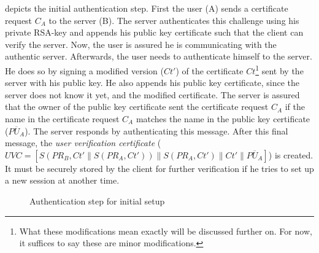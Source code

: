  depicts the initial authentication step. First the user (A) sends a certificate request $C_A$ to the server (B). The server authenticates this challenge using his private RSA-key and appends his public key certificate such that the client can verify the server. Now, the user is assured he is communicating with the authentic server. Afterwards, the user needs to authenticate himself to the server. He does so by signing a modified version ($Ct'$) of the certificate $Ct$\footnote{What these modifications mean exactly will be discussed further on. For now, it suffices to say these are minor modifications.} sent by the server with his public key. He also appends his public key certificate, since the server does not know it yet, and the modified certificate. The server is assured that the owner of the public key certificate sent the certificate request $C_A$ if the name in the certificate request $C_A$ matches the name in the public key certificate ($\overline{PU_A}$). The server responds by authenticating this message. After this final message, the \emph{user verification certificate} ($UVC=[S(PR_B,Ct'\parallel S(PR_A,Ct'))\parallel S(PR_A,Ct')\parallel Ct'\parallel \overline{PU_A}]$) is created. It must be securely stored by the client for further verification if he tries to set up a new session at another time.

\begin{figure}[!ht]
  \renewcommand{\Bx}{8}
  \setcounter{CC}{0}
  \centering
  \caption{Authentication step for initial setup}
  \label{AuthStep}
\end{figure}

